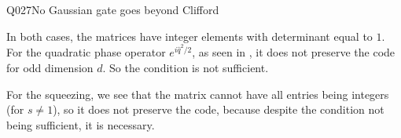 \begin{entry}{Q027}{No Gaussian gate goes beyond Clifford}
\begin{solution}[Part (c)]
In both cases, the matrices have integer elements with determinant equal to $1$. For the quadratic phase operator $e^{i\hat q^2/2}$, as seen in , it does not preserve the code for odd dimension $d$. So the condition is not sufficient. 

For the squeezing, we see that the matrix cannot have all entries being integers (for $s\neq1$), so it does not preserve the code, because despite the condition not being sufficient, it is necessary.



\end{solution}


\begin{takeaway}
\end{takeaway}


\end{entry}